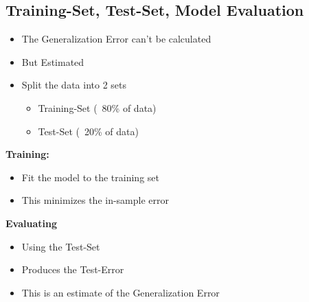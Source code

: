 \subsection{Training-Set, Test-Set, Model Evaluation}
\begin{itemize}
    \item The Generalization Error can't be calculated
    \item But Estimated
    \item Split the data into 2 sets
    \begin{itemize}
        \item Training-Set (~80\% of data)
        \item Test-Set (~20\% of data)
    \end{itemize}
\end{itemize}
\textbf{Training:} 
\begin{itemize}
    \item Fit the model to the training set
    \item This minimizes the in-sample error
\end{itemize} 
\textbf{Evaluating}
\begin{itemize}
    \item Using the Test-Set
    \item Produces the Test-Error
    \item This is an estimate of the Generalization Error
\end{itemize}

